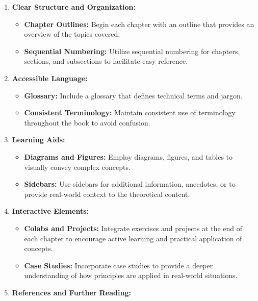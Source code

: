 \documentclass[
  11pt,
  letterpaper,
  abstract]{scrbook}
\providecommand{\tightlist}{%
  \setlength{\itemsep}{0pt}\setlength{\parskip}{0pt}}\usepackage{longtable,booktabs,array}
\begin{document}
\begin{enumerate}
\def\labelenumi{\arabic{enumi}.}
\item
  \textbf{Clear Structure and Organization:}

  \begin{itemize}
  \tightlist
  \item
    \textbf{Chapter Outlines:} Begin each chapter with an outline that
    provides an overview of the topics covered.
  \item
    \textbf{Sequential Numbering:} Utilize sequential numbering for
    chapters, sections, and subsections to facilitate easy reference.
  \end{itemize}
\item
  \textbf{Accessible Language:}

  \begin{itemize}
  \tightlist
  \item
    \textbf{Glossary:} Include a glossary that defines technical terms
    and jargon.
  \item
    \textbf{Consistent Terminology:} Maintain consistent use of
    terminology throughout the book to avoid confusion.
  \end{itemize}
\item
  \textbf{Learning Aids:}

  \begin{itemize}
  \tightlist
  \item
    \textbf{Diagrams and Figures:} Employ diagrams, figures, and tables
    to visually convey complex concepts.
  \item
    \textbf{Sidebars:} Use sidebars for additional information,
    anecdotes, or to provide real-world context to the theoretical
    content.
  \end{itemize}
\item
  \textbf{Interactive Elements:}

  \begin{itemize}
  \tightlist
  \item
    \textbf{Colabs and Projects:} Integrate exercises and projects at
    the end of each chapter to encourage active learning and practical
    application of concepts.
  \item
    \textbf{Case Studies:} Incorporate case studies to provide a deeper
    understanding of how principles are applied in real-world
    situations.
  \end{itemize}
\item
  \textbf{References and Further Reading:}


\end{enumerate}
\end{document}
